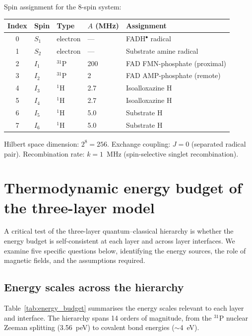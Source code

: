 \documentclass[11pt]{article}
\begin{document}
Spin assignment for the 8-spin system:

\begin{center}
\begin{tabular}{cllll}
\toprule
Index & Spin & Type & $A$ (MHz) & Assignment \\
\midrule
0 & $S_1$ & electron & --- & FADH$^\bullet$ radical \\
1 & $S_2$ & electron & --- & Substrate amine radical \\
2 & $I_1$ & $^{31}$P & 200 & FAD FMN-phosphate (proximal) \\
3 & $I_2$ & $^{31}$P & 2 & FAD AMP-phosphate (remote) \\
4 & $I_3$ & $^1$H & 2.7 & Isoalloxazine H \\
5 & $I_4$ & $^1$H & 2.7 & Isoalloxazine H \\
6 & $I_5$ & $^1$H & 5.0 & Substrate H \\
7 & $I_6$ & $^1$H & 5.0 & Substrate H \\
\bottomrule
\end{tabular}
\end{center}

Hilbert space dimension: $2^8 = 256$. Exchange coupling: $J = 0$ (separated radical pair). Recombination rate: $k = 1$~MHz (spin-selective singlet recombination).



\newpage
\section{Thermodynamic energy budget of the three-layer model}

A critical test of the three-layer quantum--classical hierarchy is whether the energy budget is self-consistent at each layer and across layer interfaces. We examine five specific questions below, identifying the energy sources, the role of magnetic fields, and the assumptions required.

\subsection{Energy scales across the hierarchy}

Table~\ref{tab:energy_budget} summarises the energy scales relevant to each layer and interface. The hierarchy spans 14 orders of magnitude, from the $^{31}$P nuclear Zeeman splitting (3.56~peV) to covalent bond energies ($\sim$4~eV).
\end{document}
